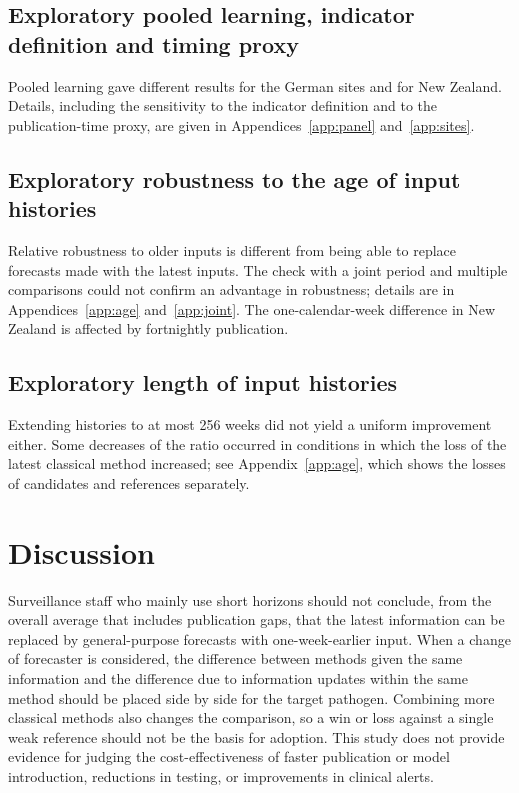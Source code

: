 \documentclass[11pt]{article}
\begin{document}
\subsection{Exploratory pooled learning, indicator definition and timing proxy}

Pooled learning gave different results for the German sites and for New Zealand. Details, including the sensitivity to the indicator definition and to the publication-time proxy, are given in Appendices~\ref{app:panel} and~\ref{app:sites}.

\subsection{Exploratory robustness to the age of input histories}

Relative robustness to older inputs is different from being able to replace forecasts made with the latest inputs. The check with a joint period and multiple comparisons could not confirm an advantage in robustness; details are in Appendices~\ref{app:age} and~\ref{app:joint}. The one-calendar-week difference in New Zealand is affected by fortnightly publication.

\subsection{Exploratory length of input histories}

Extending histories to at most 256 weeks did not yield a uniform improvement either. Some decreases of the ratio occurred in conditions in which the loss of the latest classical method increased; see Appendix~\ref{app:age}, which shows the losses of candidates and references separately.

\section{Discussion}

Surveillance staff who mainly use short horizons should not conclude, from the overall average that includes publication gaps, that the latest information can be replaced by general-purpose forecasts with one-week-earlier input. When a change of forecaster is considered, the difference between methods given the same information and the difference due to information updates within the same method should be placed side by side for the target pathogen. Combining more classical methods also changes the comparison, so a win or loss against a single weak reference should not be the basis for adoption. This study does not provide evidence for judging the cost-effectiveness of faster publication or model introduction, reductions in testing, or improvements in clinical alerts.
\end{document}
